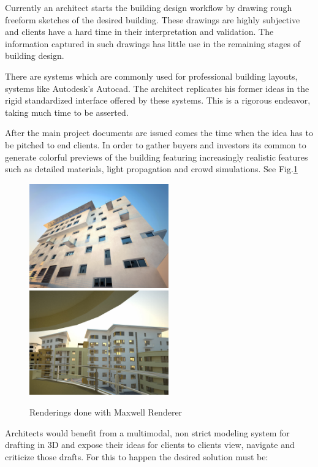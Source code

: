 Currently an architect starts the building design workflow by drawing rough
freeform sketches of the desired building. These drawings are highly subjective
and clients have a hard time in their interpretation and validation.
The information captured in such drawings has little use in the remaining stages
of building design.


There are systems which are commonly used for professional building layouts, systems
like Autodesk's Autocad. The architect replicates his former ideas in the rigid
standardized interface offered by these systems. This is a rigorous endeavor,
taking much time to be asserted.

After the main project documents are issued comes the time when the idea has to
be pitched to end clients.
In order to gather buyers and investors its common to generate colorful previews of the building featuring increasingly realistic features such as detailed materials, light propagation and crowd simulations. See
Fig.\ref{FIG-REALISTIC}

\begin{figure}[!ht]
	\centering
	\includegraphics[width=6cm]{gfx/realistic01.jpg}
	\includegraphics[width=6cm]{gfx/realistic03.jpg}
	\caption{Renderings done with Maxwell Renderer}
	\label{FIG-REALISTIC}
\end{figure}

Architects would benefit from a multimodal, non strict modeling system
for drafting in 3D and expose their ideas for clients to clients view, navigate
and criticize those drafts. For this to happen the desired solution must be:

